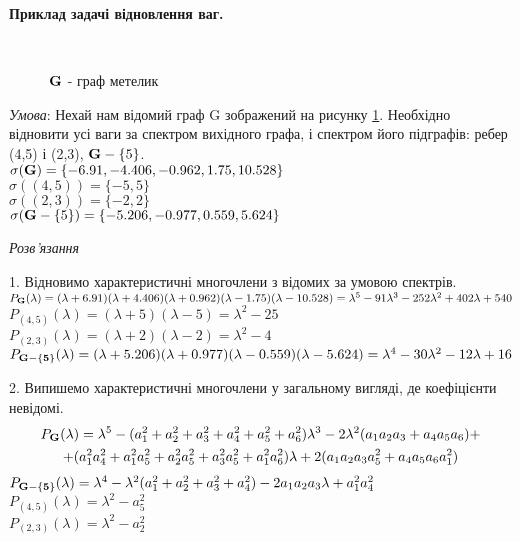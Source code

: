 \textbf{Приклад задачі відновлення ваг.}\\
\begin{figure}[H]
    \centering
    \\
    \caption{$\bf G$ - граф метелик}
    \label{zad:image}
\end{figure}
\textit{Умова}: Нехай нам відомий граф G зображений на рисунку \ref{zad:image}. Необхідно відновити усі ваги  за спектром вихідного графа, і спектром його підграфів: ребер (4,5) і (2,3), ${\bf G}-\{5\}$.\\
$\sigma({\bf G}) = \{-6.91, -4.406, -0.962, 1.75,10.528\}$\\
$\sigma((4,5)) = \{-5,5\}$\\
$\sigma((2,3)) = \{-2,2\}$\\
$\sigma({\bf G}-\{5\}) = \{-5.206, -0.977, 0.559, 5.624\}$

\textit{Розв'язання}

1. Відновимо характеристичні многочлени з відомих за умовою спектрів.\\
$P_{\bf G}(\lambda) = (\lambda + 6.91)(\lambda + 4.406)(\lambda + 0.962)(\lambda - 1.75)(\lambda - 10.528) = \lambda^5-91\lambda^3-252\lambda^2+402\lambda+540$\\
$P_{(4,5)}(\lambda) = (\lambda + 5)(\lambda - 5) = \lambda^2 - 25$\\
$P_{(2,3)}(\lambda) = (\lambda + 2)(\lambda - 2) = \lambda^2 - 4$\\
$P_{\bf G-\{5\}}(\lambda) = (\lambda + 5.206)(\lambda + 0.977)(\lambda - 0.559)(\lambda - 5.624) = \lambda^4-30\lambda^2-12\lambda+16$

2. Випишемо характеристичні многочлени у загальному вигляді, де коефіцієнти невідомі.
\begin{multline*}
P_{\bf G}(\lambda) = \lambda^5 - (a_1^2+a_2^2+a_3^2+a_4^2+a_5^2+a_6^2)\lambda^3 - 2\lambda^2(a_1a_2a_3 + a_4a_5a_6) + \\
+(a_1^2a_4^2+a_1^2a_5^2+a_2^2a_5^2+a_3^2a_5^2+a_1^2a_6^2)\lambda
+2(a_1a_2a_3a_5^2 +a_4a_5a_6a_1^2)
\end{multline*}
$P_{\bf G-\{5\}}(\lambda) = \lambda^4 - \lambda^2(a_1^2+a_2^2+a_3^2+a_4^2)- 2a_1a_2a_3\lambda + a_1^2a_4^2 $\\
$P_{(4,5)}(\lambda) = \lambda^2-a_5^2$\\
$P_{(2,3)}(\lambda) = \lambda^2-a_2^2$

